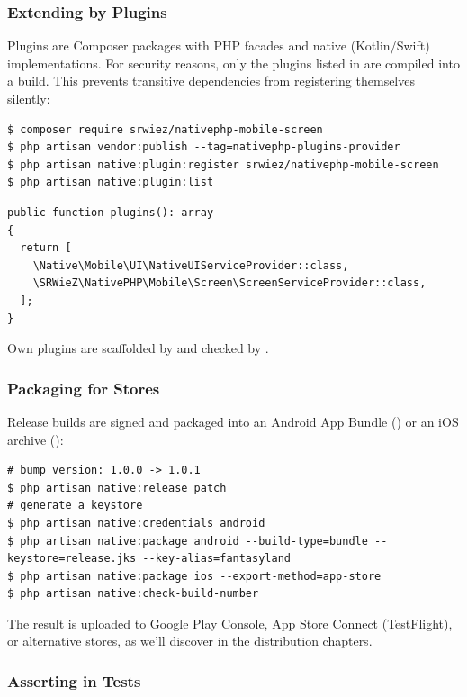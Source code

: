 \subsubsection{Extending by Plugins}

Plugins are Composer packages with PHP facades and native (Kotlin/Swift) implementations. For
security reasons, only the plugins listed in  are compiled
into a build. This prevents transitive dependencies from registering themselves silently:

\begin{lstlisting}[language=terminal]
$ composer require srwiez/nativephp-mobile-screen
$ php artisan vendor:publish --tag=nativephp-plugins-provider
$ php artisan native:plugin:register srwiez/nativephp-mobile-screen
$ php artisan native:plugin:list
\end{lstlisting}

\begin{lstlisting}
public function plugins(): array
{
  return [
    \Native\Mobile\UI\NativeUIServiceProvider::class,
    \SRWieZ\NativePHP\Mobile\Screen\ScreenServiceProvider::class,
  ];
}
\end{lstlisting}

\noindent Own plugins are scaffolded by  and checked by
.


\subsubsection{Packaging for Stores}

Release builds are signed and packaged into an Android App Bundle () or an iOS archive ():

\begin{lstlisting}[language=terminal]
# bump version: 1.0.0 -> 1.0.1
$ php artisan native:release patch
# generate a keystore
$ php artisan native:credentials android
$ php artisan native:package android --build-type=bundle --keystore=release.jks --key-alias=fantasyland
$ php artisan native:package ios --export-method=app-store
$ php artisan native:check-build-number
\end{lstlisting}

\noindent The result is uploaded to Google Play Console, App Store Connect (TestFlight), or
alternative stores, as we'll discover in the distribution chapters.


\subsubsection{Asserting in Tests}

